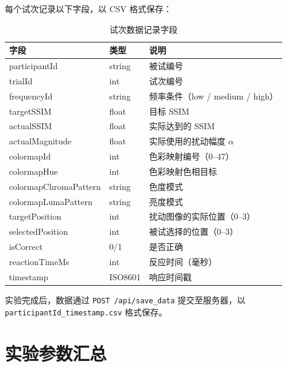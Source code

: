 \documentclass{article}
\begin{document}
每个试次记录以下字段，以 CSV 格式保存：

\begin{table}[H]
\centering
\small
\begin{tabular}{lll}
\toprule
字段 & 类型 & 说明 \\
\midrule
participantId       & string  & 被试编号 \\
trialId             & int     & 试次编号 \\
frequencyId         & string  & 频率条件（low / medium / high）\\
targetSSIM          & float   & 目标 SSIM \\
actualSSIM          & float   & 实际达到的 SSIM \\
actualMagnitude     & float   & 实际使用的扰动幅度 $\alpha$ \\
colormapId          & int     & 色彩映射编号（0--47）\\
colormapHue         & int     & 色彩映射色相目标 \\
colormapChromaPattern & string & 色度模式 \\
colormapLumaPattern & string  & 亮度模式 \\
targetPosition      & int     & 扰动图像的实际位置（0--3）\\
selectedPosition    & int     & 被试选择的位置（0--3）\\
isCorrect           & 0/1     & 是否正确 \\
reactionTimeMs      & int     & 反应时间（毫秒）\\
timestamp           & ISO8601 & 响应时间戳 \\
\bottomrule
\end{tabular}
\caption{试次数据记录字段}
\end{table}

实验完成后，数据通过 \texttt{POST /api/save\_data} 提交至服务器，以 \texttt{participantId\_timestamp.csv} 格式保存。


\section{实验参数汇总}
\end{document}
